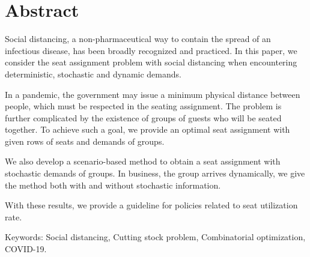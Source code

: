 
\section*{Abstract}
Social distancing, a non-pharmaceutical way to contain the spread of an infectious disease, has been broadly recognized and practiced. In this paper, we consider the seat assignment problem with social distancing when encountering deterministic, stochastic and dynamic demands.

In a pandemic, the government may issue a minimum physical distance between people, which must be respected in the seating assignment. The problem is further complicated by the existence of groups of guests who will be seated together. To achieve such a goal, we provide an optimal seat assignment with given rows of seats and demands of groups.

We also develop a scenario-based method to obtain a seat assignment with stochastic demands of groups. In business, the group arrives dynamically, we give the method both with and without stochastic information.

With these results, we provide a guideline for policies related to seat utilization rate.

Keywords: Social distancing, Cutting stock problem, Combinatorial optimization, COVID-19.
